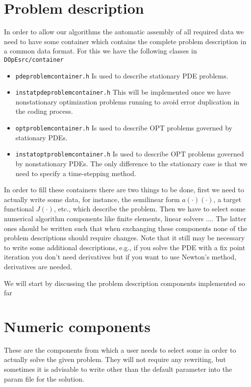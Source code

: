 \section{Problem description}
In order to allow our algorithms the automatic assembly of all required 
data we need to have some container which contains the complete problem 
description in a common data format. For this we have the following 
classes in \texttt{DOpEsrc/container}
\begin{itemize}
  \item \texttt{pdeproblemcontainer.h} Is used to describe  stationary PDE problems.
  \item \texttt{instatpdeproblemcontainer.h} 
This will be implemented once we have nonstationary optimization problems running to avoid error duplication in the coding process.
  \item \texttt{optproblemcontainer.h} Is used to describe  OPT problems governed by 
    stationary PDEs. 
  \item \texttt{instatoptproblemcontainer.h} Is used to describe  OPT problems governed by nonstationary PDEs. The only difference to the stationary case is that we need to specify a time-stepping method.  
\end{itemize}
In order to fill these containers there are two things to be done,
first we need to actually write some data, for instance,
the semilinear form $a(\cdot)(\cdot)$, a target functional $J(\cdot)$, etc.,
which describe the problem. Then we have to select some numerical 
algorithm components like finite elements, linear solvers $\ldots$.
The latter ones should be written such that when exchanging these components
none of the problem descriptions should require changes. 
Note that it still may be necessary to write some additional descriptions, 
e.g., if you solve the PDE with a fix point iteration you don't need derivatives
but if you want to use Newton's method, derivatives are needed.

We will start by discussing the problem description components implemented so far


\section{Numeric components}
These are the components from which a user needs to select some in order to actually 
solve the given problem. They will not require any rewriting, but sometimes it is 
advisable to write other than the default parameter into the param file for the 
solution.

